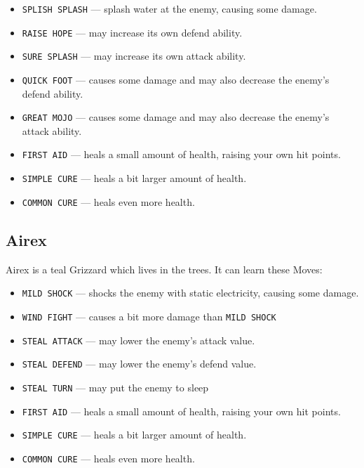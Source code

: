 \documentclass[10pt,twocolumn,openany,article]{memoir}
\begin{document}
\begin{description}
\begin{itemize}
\item  \texttt{SPLISH SPLASH}  --- splash  water at  the enemy,  causing
  some damage. 
\item \texttt{RAISE HOPE} --- may increase its own defend ability.
\item \texttt{SURE SPLASH} --- may increase its own attack ability.
\item \texttt{QUICK FOOT}  --- causes some damage and  may also decrease
  the enemy's defend ability.
\item \texttt{GREAT MOJO}  --- causes some damage and  may also decrease
  the enemy's attack ability.
\item \texttt{FIRST  AID} ---  heals a small  amount of  health, raising
  your own hit points.
\item \texttt{SIMPLE CURE} --- heals a bit larger amount of health.
\item \texttt{COMMON CURE} --- heals even more health.
\end{itemize}

\ifdefined\DEMO\else

\subsection{Airex}

Airex is a teal Grizzard which lives in the trees. It can learn these Moves:

\begin{itemize}
\item \texttt{MILD SHOCK} --- shocks  the enemy with static electricity,
  causing some damage.
\item \texttt{WIND FIGHT} --- causes a bit more damage than \texttt{MILD SHOCK}
\item \texttt{STEAL ATTACK} --- may lower the enemy's attack value.
\item \texttt{STEAL DEFEND} --- may lower the enemy's defend value.
\item \texttt{STEAL TURN} --- may put the enemy to sleep
\item \texttt{FIRST  AID} ---  heals a small  amount of  health, raising
  your own hit points.
\item \texttt{SIMPLE CURE} --- heals a bit larger amount of health.
\item \texttt{COMMON CURE} --- heals even more health.
\end{itemize}

\fi


\end{description}
\end{document}
